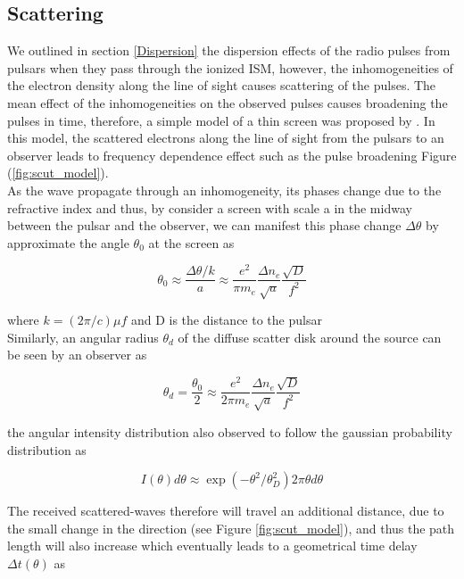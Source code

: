 \subsection{Scattering}
We outlined in section \cref{Dispersion} the dispersion effects of the radio pulses from pulsars when they pass through the ionized ISM, however, the inhomogeneities of the electron density along the line of sight causes scattering of the pulses. The mean effect of the inhomogeneities on the observed pulses causes broadening the pulses in time, therefore, a simple model of a thin screen was proposed by \citet{williamson1972pulse}. In this model, the scattered electrons along the line of sight from the pulsars to an observer leads to frequency dependence effect such as the pulse broadening Figure (\ref{fig:scut_model}).\\
As the wave propagate through an inhomogeneity, its phases change due to the refractive index and thus, by consider a screen with scale a in the midway between the pulsar and the observer, we can manifest this phase change $\Delta\theta$ by approximate the angle $\theta_0$ at the screen as

\begin{equation}
\label{angle}
\theta_{0} \approx \frac{\Delta\theta / k}{a} \approx \frac{e^2}{\pi m_e} \frac{\Delta n_e}{\sqrt{a}} \frac{\sqrt{D}}{f^2}
\end{equation}

where $k = (2\pi/c) \mu f$ and D is the distance to the pulsar\\
Similarly, an angular radius $\theta_d$ of the diffuse scatter disk around the source can be seen by an observer as

\begin{equation}
\label{anglular}
\theta_{d} = \frac{\theta_0}{2} \approx \frac{e^2}{2\pi m_e} \frac{\Delta n_e}{\sqrt{a}} \frac{\sqrt{D}}{f^2}
\end{equation}

the angular intensity distribution also observed to follow the gaussian probability distribution as 

\begin{equation}
\label{intinsity}
I(\theta)d\theta \approx \exp(-\theta^2/\theta^2_D) 2 \pi \theta d\theta
\end{equation}

The received scattered-waves therefore will travel an additional distance, due to the small change in the direction (see Figure \ref{fig:scut_model}), and thus the path length will also increase which eventually leads to a geometrical time delay $\Delta t(\theta)$ as

